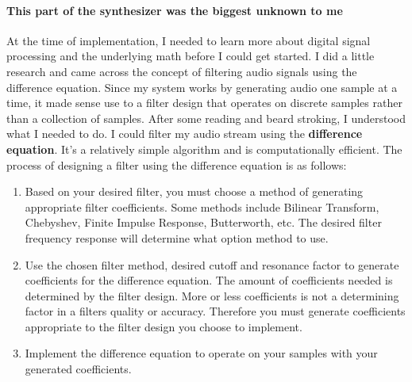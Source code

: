 \documentclass[acmlarge,screen]{acmart}
\begin{document}
	\paragraph{This part of the synthesizer was the biggest unknown to me} At the time of implementation, I needed to learn more about digital signal processing and the underlying math before I could get started. I did a little research and came across the concept of filtering audio signals using the difference equation. Since my system works by generating audio one sample at a time, it made sense use to a filter design that operates on discrete samples rather than a collection of samples. After some reading and beard stroking, I understood what I needed to do. I could filter my audio stream using the \textbf{difference equation}. It's a relatively simple algorithm and is computationally efficient. The process of designing a filter using the difference equation is as follows:
	
	\begin{enumerate}
		\item Based on your desired filter, you must choose a method of generating appropriate filter coefficients. Some methods include Bilinear Transform, Chebyshev, Finite Impulse Response, Butterworth, etc. The desired filter frequency response will determine what option method to use.
		\item Use the chosen filter method, desired cutoff and resonance factor to generate coefficients for the difference equation. The amount of coefficients needed is determined by the filter design. More or less coefficients is not a determining factor in a filters quality or accuracy. Therefore you must generate coefficients appropriate to the filter design you choose to implement.
		\item Implement the difference equation to operate on your samples with your generated coefficients.
	\end{enumerate}
\end{document}
